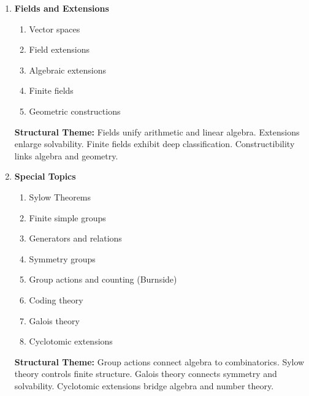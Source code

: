\begin{enumerate}
\vspace{0.5em}
\textbf{Structural Theme:}
Rings generalize arithmetic.
Ideals control structure via quotients.
Factorization encodes algebraic rigidity.
Euclidean domains permit algorithmic structure.


\item \textbf{Fields and Extensions}

\begin{enumerate}
    \item Vector spaces
    \item Field extensions
    \item Algebraic extensions
    \item Finite fields
    \item Geometric constructions
\end{enumerate}

\vspace{0.5em}
\textbf{Structural Theme:}
Fields unify arithmetic and linear algebra.
Extensions enlarge solvability.
Finite fields exhibit deep classification.
Constructibility links algebra and geometry.


\item \textbf{Special Topics}

\begin{enumerate}
    \item Sylow Theorems
    \item Finite simple groups
    \item Generators and relations
    \item Symmetry groups
    \item Group actions and counting (Burnside)
    \item Coding theory
    \item Galois theory
    \item Cyclotomic extensions
\end{enumerate}

\vspace{0.5em}
\textbf{Structural Theme:}
Group actions connect algebra to combinatorics.
Sylow theory controls finite structure.
Galois theory connects symmetry and solvability.
Cyclotomic extensions bridge algebra and number theory.

\end{enumerate}

